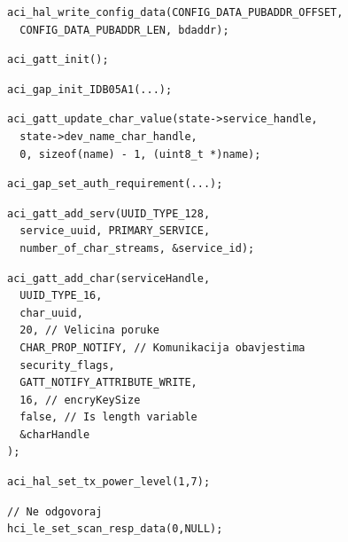 \documentclass[times, utf8, diplomski]{diplomski}
\begin{document}
\begin{lstlisting}[caption={Postavi MAC adresu}, label={firstinit}]
aci_hal_write_config_data(CONFIG_DATA_PUBADDR_OFFSET,
  CONFIG_DATA_PUBADDR_LEN, bdaddr);
\end{lstlisting}

\begin{lstlisting}[caption={Inicijaliziraj gatt podsustav}]
aci_gatt_init();
\end{lstlisting}

\begin{lstlisting}[caption={Inicijaliziraj gap podsustav}]
aci_gap_init_IDB05A1(...);
\end{lstlisting}

\begin{lstlisting}[caption={Postavi ime kojim će se predstavljati ostalim bluetooth uređajima.}]
aci_gatt_update_char_value(state->service_handle,
  state->dev_name_char_handle,
  0, sizeof(name) - 1, (uint8_t *)name);
\end{lstlisting}

\begin{lstlisting}[caption={Postavi autentifikacijske zahtjeve}]
aci_gap_set_auth_requirement(...);
\end{lstlisting}

\begin{lstlisting}[caption={Postavljanje sevisa koji sadrži karakteristične tokve}]
aci_gatt_add_serv(UUID_TYPE_128,
  service_uuid, PRIMARY_SERVICE,
  number_of_char_streams, &service_id);
\end{lstlisting}

\begin{lstlisting}[caption={Postavljanje karakterističnih tokova}]
aci_gatt_add_char(serviceHandle,
  UUID_TYPE_16,
  char_uuid,
  20, // Velicina poruke
  CHAR_PROP_NOTIFY, // Komunikacija obavjestima
  security_flags,
  GATT_NOTIFY_ATTRIBUTE_WRITE,
  16, // encryKeySize
  false, // Is length variable
  &charHandle
);
\end{lstlisting}

\begin{lstlisting}[caption={Postavi snagu odašiljača}]
aci_hal_set_tx_power_level(1,7);
\end{lstlisting}

\begin{lstlisting}[caption={Postavi odgovor na poruku otkrivanja (engl. discover message)}]
// Ne odgovoraj
hci_le_set_scan_resp_data(0,NULL);
\end{lstlisting}
\end{document}
